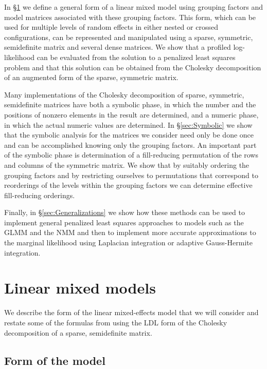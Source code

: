 \documentclass[12pt]{article}
\begin{document}
In \S\ref{sec:LinearMixed} we define a general form of a linear mixed
model using grouping factors and model matrices associated
with these grouping factors.  This form, which can be used for multiple
levels of random effects in either nested or crossed configurations,
can be represented and manipulated using a sparse, symmetric,
semidefinite matrix and several dense matrices.  We show that a
profiled log-likelihood can be evaluated from the solution to a
penalized least squares problem and that this solution can be obtained
from the Cholesky decomposition of an augmented form of the sparse,
symmetric matrix.

Many implementations of the Cholesky decomposition of sparse,
symmetric, semidefinite matrices have both a symbolic phase, in which
the number and the positions of nonzero elements in the result are determined,
and a numeric phase, in which the actual numeric values are
determined.  In \S\ref{sec:Symbolic} we show that the symbolic
analysis for the matrices we consider need only be done once and can
be accomplished knowing only the grouping factors.  An important part
of the symbolic phase is determination of a fill-reducing permutation
of the rows and columns of the symmetric matrix.  We show that by
suitably ordering the grouping factors and by restricting ourselves to
permutations that correspond to reorderings of the levels within the
grouping factors we can determine effective fill-reducing orderings.

Finally, in \S\ref{sec:Generalizations} we show how these methods can be
used to implement general penalized least squares approaches to models
such as the GLMM and the NMM and then to implement more accurate
approximations to the marginal likelihood using Laplacian integration
or adaptive Gauss-Hermite integration.

\section{Linear mixed models}
\label{sec:LinearMixed}

We describe the form of the linear mixed-effects model that we will
consider and restate some of the formulas from \citet{bate:debr:2004}
using the LDL form of the Cholesky decomposition of a sparse,
semidefinite matrix.

\subsection{Form of the model}
\label{ssec:ModelForm}
\end{document}
